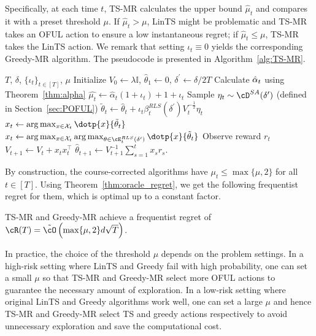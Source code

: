 Specifically, at each time $t$, TS-MR calculates the upper bound $\hat{\mu}_t$ and compares it with a preset threshold $\mu$. If  $\hat{\mu}_t > \mu$, LinTS might be problematic and  TS-MR takes an OFUL action to ensure a low instantaneous regret; if $\hat{\mu}_t\leq \mu$, TS-MR  takes the LinTS action. We remark that setting $\iota_t \equiv 0$ yields the corresponding Greedy-MR algorithm. The pseudocode is presented in Algorithm~\ref{alg:TS-MR}.





\begin{algorithm}[!htp]
	\caption{TS-MR (Greedy-MR)}\label{alg:TS-MR}
	\begin{algorithmic}
		\REQUIRE $T$, $\delta$,  $\{\iota_t\}_{t\in [T]}$, $\mu$	
		\STATE Initialize $ V_{0} \leftarrow \lambda \mathbb{I}$,  $\hat{\theta}_{1} \leftarrow 0$, $\delta^\prime \leftarrow \delta/2T$
		\STATE Calculate $\hat{\alpha}_t$ using Theorem~\ref{thm:alpha}
		\STATE $\hat{\mu_t} \leftarrow  \hat{\alpha}_t(1+\iota_t )+1+\iota_t$ 
		\STATE Sample $\eta_t\sim \cD^{SA}(\delta^\prime)$ (defined in Section~\ref{sec:POFUL})
		\STATE $\tilde{\theta}_{t}  \leftarrow \hat{\theta}_t +\iota_t \beta_t^{RLS} (\delta^\prime) V_t^{-\frac{1}{2}} \eta_t$
		\STATE ${x}_{t} \leftarrow \arg \max _{x \in \mathcal{X}_t}\dotp{ x}{ \tilde{\theta}_{t}}$
		\ELSE
		\STATE   ${x}_{t} \leftarrow \arg \max _{x \in \mathcal{X}_t} \arg \max _{\theta \in \cE_t^{RLS}(\delta^\prime) }\dotp{ x}{ \tilde{\theta}_{t}}$
		\ENDIF
		\STATE Observe reward $r_{t}$
		\STATE $V_{t+1} \leftarrow V_{t}+{x}_{t}  {x}_{t}^{\top}$
		\STATE $\hat{\theta}_{t+1} \leftarrow V_{t+1}^{-1}\sum_{s=1}^{t} x_s r_{s}$.
		\ENDFOR
	\end{algorithmic}
\end{algorithm}






By construction, the course-corrected algorithms have $\mu_t \leq  \max\{\mu,2\}$ for all $t\in[T]$. Using Theorem~\ref{thm:oracle_regret}, we get the following frequentist regret for them, which is optimal up to a constant factor.
\begin{corollary} TS-MR and Greedy-MR achieve a frequentist regret of
$
	\cR(T) = \tilde{\cO}\left( \max\{\mu,2\} d \sqrt{T}\right)
$.
\end{corollary}


\begin{remark}
In practice, the choice of the threshold $\mu$ depends on the problem settings. In a high-risk setting where LinTS and Greedy fail with high probability, one can set a small $\mu$ so that  TS-MR and Greedy-MR select more OFUL actions to guarantee the necessary amount of exploration. In a low-risk setting where original LinTS and Greedy algorithms work well, one can set a large $\mu$ and hence  TS-MR and Greedy-MR select TS and greedy actions respectively to avoid unnecessary exploration and save the computational cost. 
\end{remark}








